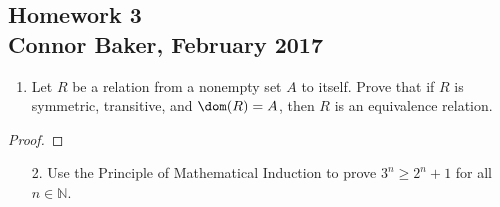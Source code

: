 \documentclass[10pt]{article}
\theoremstyle{definition}
\theoremstyle{plain}
\newcommand{\N}{\mathbb{N}}
\begin{document}
\begin{center}
  \subsection*{Homework 3\\Connor Baker, February 2017}
\end{center}

\begin{enumerate}
\item Let $R$ be a relation from a nonempty set $A$ to itself.  Prove that if $R$ is symmetric, transitive, and $\dom(R) = A$, then $R$ is an equivalence relation.
\end{enumerate}

\begin{proof}
\end{proof}



\pagebreak



\begin{enumerate}
  \item[2.] Use the Principle of Mathematical Induction to prove $3^n \geq 2^n + 1$ for all $n \in \N$.
\end{enumerate}
\end{document}
